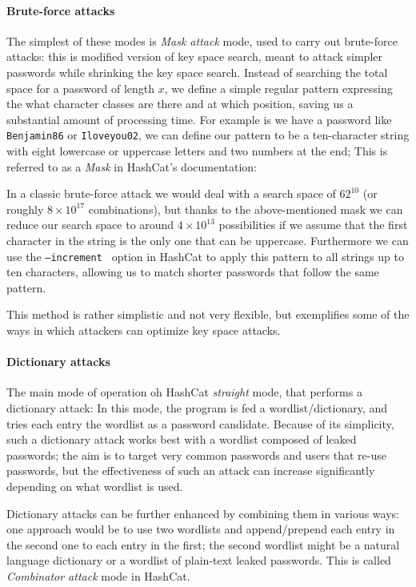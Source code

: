 \paragraph{Brute-force attacks}
The simplest of these modes is \emph{Mask attack} mode, used to carry out brute-force attacks: this is modified version of key space search, meant to attack simpler passwords while shrinking the key space search. 
Instead of searching the total space for a password of length $x$, we define a simple regular pattern expressing the what character classes are there and at which position, saving us a substantial amount of processing time.
For example is we have a password like \texttt{Benjamin86} or \texttt{Iloveyou02}, we can define our pattern to be a ten-character string with eight lowercase or uppercase letters and two numbers at the end; This is referred to as a \emph{Mask} in HashCat's documentation:

In a classic brute-force attack we would deal with a search space of $62^{10}$ (or roughly $8 \times 10^{17}$ combinations), but thanks to the above-mentioned mask we can reduce our search space to around $4 \times 10^{13}$ possibilities if we assume that the first character in the string is the only one that can be uppercase.
Furthermore we can use the \texttt{--increment } option in HashCat to apply this pattern to all strings up to ten characters, allowing us to match shorter passwords that follow the same pattern.

This method is rather simplistic and not very flexible, but exemplifies some of the ways in which attackers can optimize key space attacks.

\paragraph{Dictionary attacks}
The main mode of operation oh HashCat \emph{straight} mode, that performs a dictionary attack: In this mode, the program is fed a wordlist/dictionary, and tries each entry the wordlist as a password candidate. Because of its simplicity, such a dictionary attack works best with a wordlist composed of leaked passwords; the aim is to target very common passwords and users that re-use passwords, but the effectiveness of such an attack can increase significantly depending on what wordlist is used.

Dictionary attacks can be further enhanced by combining them in various ways: one approach would be to use two wordlists and append/prepend each entry in the second one to each entry in the first; 
the second wordlist might be a natural language dictionary or a wordlist of plain-text leaked passwords. This is called \emph{Combinator attack} mode in HashCat. 

